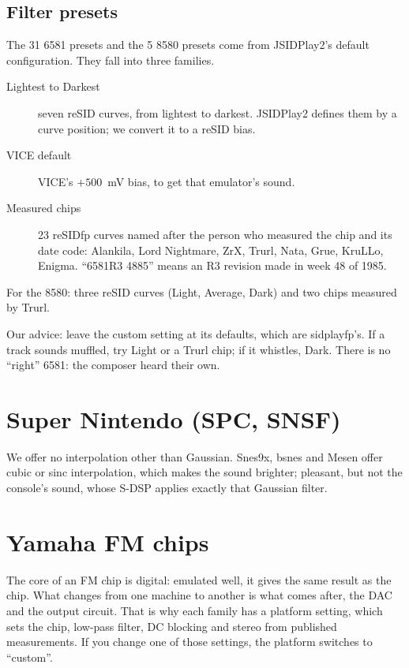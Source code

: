 \subsection*{Filter presets}
The 31 6581 presets and the 5 8580 presets come from JSIDPlay2's default configuration. They fall into three
families.
\begin{description}
  \item[Lightest to Darkest] seven reSID curves, from lightest to darkest. JSIDPlay2 defines them by a curve
        position; we convert it to a reSID bias.
  \item[VICE default] VICE's $+500$~mV bias, to get that emulator's sound.
  \item[Measured chips] 23 reSIDfp curves named after the person who measured the chip and its date code: Alankila,
        Lord Nightmare, ZrX, Trurl, Nata, Grue, KruLLo, Enigma. ``6581R3 4885'' means an R3 revision made in week 48 of
        1985.
\end{description}
For the 8580: three reSID curves (Light, Average, Dark) and two chips measured by Trurl.

Our advice: leave the custom setting at its defaults, which are sidplayfp's. If a track sounds muffled, try Light or a
Trurl chip; if it whistles, Dark. There is no ``right'' 6581: the composer heard their own.

\section{Super Nintendo (SPC, SNSF)}
\begin{reglages}
\end{reglages}
We offer no interpolation other than Gaussian. Snes9x, bsnes and Mesen offer cubic or sinc interpolation, which makes
the sound brighter; pleasant, but not the console's sound, whose S-DSP applies exactly that Gaussian filter.

\section{Yamaha FM chips}
The core of an FM chip is digital: emulated well, it gives the same result as the chip. What changes from one
machine to another is what comes after, the DAC and the output circuit. That is why each family has a platform
setting, which sets the chip, low-pass filter, DC blocking and stereo from published measurements. If you change one
of those settings, the platform switches to ``custom''.

